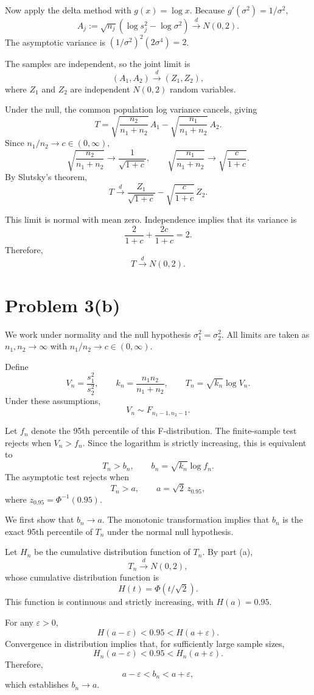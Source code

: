 \documentclass[11pt]{article}
\begin{document}
Now apply the delta method with $g(x)=\log x$.
Because $g'(\sigma^2)=1/\sigma^2$,
\[
A_j
:=\sqrt{n_j}
\left(\log s_j^2-\log\sigma^2\right)
\xrightarrow{d}N(0,2).
\]
The asymptotic variance is
$(1/\sigma^2)^2(2\sigma^4)=2$.

The samples are independent, so the joint limit is
\[
(A_1,A_2)\xrightarrow{d}(Z_1,Z_2),
\]
where $Z_1$ and $Z_2$ are independent
$N(0,2)$ random variables.

Under the null, the common population
log variance cancels, giving
\[
T=
\sqrt{\frac{n_2}{n_1+n_2}}\,A_1
-
\sqrt{\frac{n_1}{n_1+n_2}}\,A_2.
\]
Since $n_1/n_2\to c\in(0,\infty)$,
\[
\sqrt{\frac{n_2}{n_1+n_2}}
\longrightarrow\frac{1}{\sqrt{1+c}},
\qquad
\sqrt{\frac{n_1}{n_1+n_2}}
\longrightarrow\sqrt{\frac{c}{1+c}}.
\]
By Slutsky's theorem,
\[
T\xrightarrow{d}
\frac{Z_1}{\sqrt{1+c}}
-\sqrt{\frac{c}{1+c}}\,Z_2.
\]

This limit is normal with mean zero.
Independence implies that its variance is
\[
\frac{2}{1+c}+\frac{2c}{1+c}=2.
\]
Therefore,
\[
\boxed{T\xrightarrow{d}N(0,2).}
\]
\section*{Problem 3(b)}

We work under normality and the null hypothesis
$\sigma_1^2=\sigma_2^2$. All limits are taken as
$n_1,n_2\to\infty$ with $n_1/n_2\to c\in(0,\infty)$.

Define
\[
V_n=\frac{s_1^2}{s_2^2},
\qquad
k_n=\frac{n_1n_2}{n_1+n_2},
\qquad
T_n=\sqrt{k_n}\log V_n.
\]
Under these assumptions,
\[
V_n\sim F_{n_1-1,n_2-1}.
\]

Let $f_n$ denote the 95th percentile of this
F-distribution. The finite-sample test rejects
when $V_n>f_n$. Since the logarithm is strictly
increasing, this is equivalent to
\[
T_n>b_n,
\qquad
b_n=\sqrt{k_n}\log f_n.
\]
The asymptotic test rejects when
\[
T_n>a,
\qquad
a=\sqrt{2}\,z_{0.95},
\]
where $z_{0.95}=\Phi^{-1}(0.95)$.

We first show that $b_n\to a$.
The monotonic transformation implies that
$b_n$ is the exact 95th percentile of $T_n$
under the normal null hypothesis.

Let $H_n$ be the cumulative distribution
function of $T_n$. By part (a),
\[
T_n\xrightarrow{d}N(0,2),
\]
whose cumulative distribution function is
\[
H(t)=\Phi(t/\sqrt{2}).
\]
This function is continuous and strictly
increasing, with $H(a)=0.95$.

For any $\varepsilon>0$,
\[
H(a-\varepsilon)<0.95<H(a+\varepsilon).
\]
Convergence in distribution implies that,
for sufficiently large sample sizes,
\[
H_n(a-\varepsilon)<0.95<H_n(a+\varepsilon).
\]
Therefore,
\[
a-\varepsilon<b_n<a+\varepsilon,
\]
which establishes $b_n\to a$.
\end{document}
